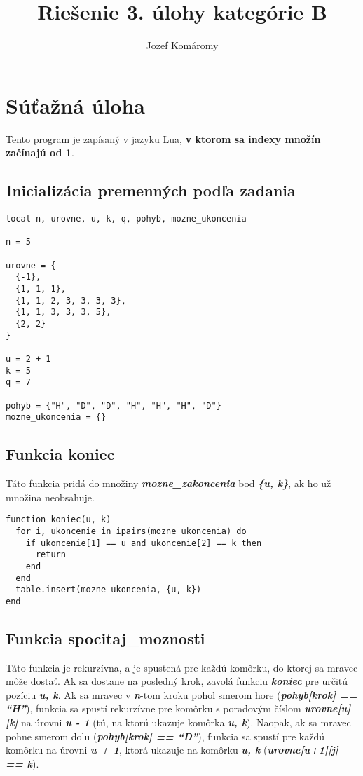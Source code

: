 \documentclass{article}
\begin{document}
\title{Riešenie 3. úlohy kategórie B}
\author{Jozef Komáromy}

\maketitle


\section{Súťažná úloha}

Tento program je zapísaný v jazyku Lua, \textbf{v ktorom sa indexy množín začínajú od 1}.


\subsection{Inicializácia premenných podľa zadania}

\begin{lstlisting}
local n, urovne, u, k, q, pohyb, mozne_ukoncenia

n = 5

urovne = {
  {-1},
  {1, 1, 1},
  {1, 1, 2, 3, 3, 3, 3},
  {1, 1, 3, 3, 3, 5},
  {2, 2}
}

u = 2 + 1
k = 5
q = 7

pohyb = {"H", "D", "D", "H", "H", "H", "D"}
mozne_ukoncenia = {}
\end{lstlisting}

\subsection{Funkcia koniec}


Táto funkcia pridá do množiny \textbf{\textit{mozne\_zakoncenia}} bod \textbf{\textit{\{u, k\}}}, ak ho už množina neobsahuje.


\begin{lstlisting}
function koniec(u, k)
  for i, ukoncenie in ipairs(mozne_ukoncenia) do
    if ukoncenie[1] == u and ukoncenie[2] == k then
      return
    end
  end
  table.insert(mozne_ukoncenia, {u, k})
end
\end{lstlisting}

\subsection{Funkcia spocitaj\_moznosti}

Táto funkcia je rekurzívna, a je spustená pre každú komôrku, do ktorej sa mravec môže dostať. Ak sa dostane na posledný krok, zavolá funkciu \textbf{\textit{koniec}} pre určitú pozíciu \textbf{\textit{u, k}}.
Ak sa mravec v \textbf{\textit{n}}-tom kroku pohol smerom hore (\textbf{\textit{pohyb[krok] == ``H''}}), funkcia sa spustí rekurzívne pre komôrku s poradovým číslom \textbf{\textit{urovne[u][k]}} na úrovni \textbf{\textit{u - 1}} (tú, na ktorú ukazuje komôrka \textbf{\textit{u, k}}).
Naopak, ak sa mravec pohne smerom dolu (\textbf{\textit{pohyb[krok] == ``D''}}), funkcia sa spustí pre každú komôrku na úrovni \textbf{\textit{u + 1}}, ktorá ukazuje na komôrku \textbf{\textit{u, k}} (\textbf{\textit{urovne[u+1][j] == k}}).
\end{document}
